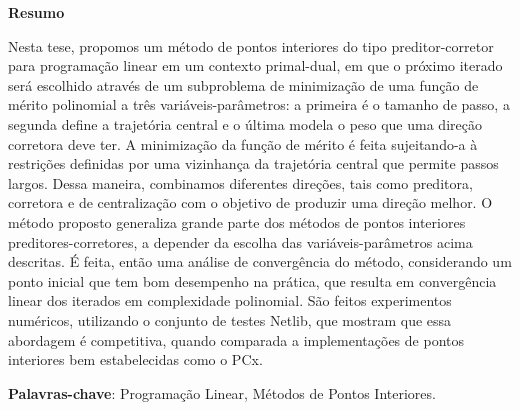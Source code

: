 \begin{center}
  \large{\textbf{Resumo}}
\end{center}

Nesta tese, propomos um método de pontos interiores do tipo preditor-corretor para programação linear em um contexto primal-dual, em que o próximo iterado será escolhido através de um subproblema de minimização de uma função de mérito polinomial a três variáveis-parâmetros: a primeira  é o tamanho de passo, a segunda define a trajetória central e o última modela o peso que uma direção corretora deve ter. A minimização da função de mérito é feita   sujeitando-a à restrições  definidas por uma vizinhança da trajetória central que permite passos largos. Dessa maneira, combinamos diferentes direções, tais como preditora, corretora e de centralização com o objetivo de produzir uma direção melhor. O método proposto generaliza grande parte dos métodos de pontos interiores preditores-corretores, a depender da escolha das variáveis-parâmetros acima descritas. É feita, então uma análise de convergência do método, considerando um ponto inicial que tem bom desempenho na prática, que resulta em convergência linear dos iterados em complexidade polinomial. São feitos experimentos numéricos, utilizando o conjunto de testes Netlib, que mostram que essa abordagem é competitiva, quando comparada a implementações de pontos interiores bem estabelecidas como o PCx.




\vspace{.2cm}
\textbf{Palavras-chave}:
Programação Linear, Métodos de Pontos Interiores.

